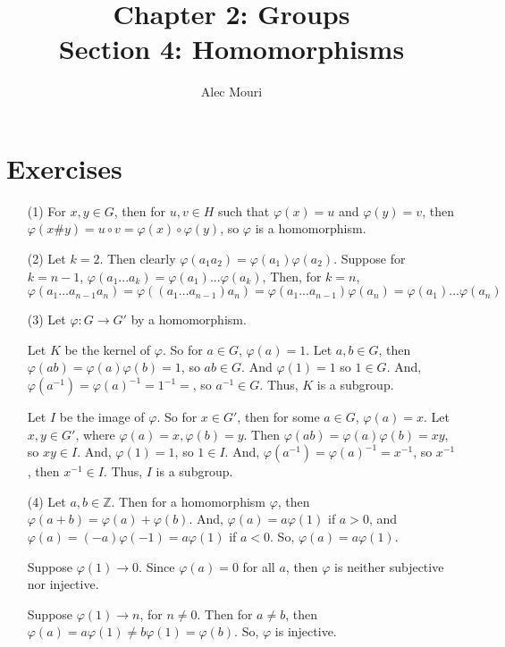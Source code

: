 \documentclass[12pt]{article}
\begin{document}
\title{Chapter 2: Groups \\ Section 4: Homomorphisms}
\author{Alec Mouri}

\maketitle
\section*{Exercises}
\begin{itemize}
\item[(1)]
For $x, y \in G$, then for $u, v \in H$ such that $\varphi(x) = u$ and $\varphi(y) = v$, then $\varphi(x \# y) = u \circ v = \varphi(x) \circ \varphi(y)$, so $\varphi$ is a homomorphism.
\item[(2)] Let $k = 2$. Then clearly $\varphi(a_1a_2) = \varphi(a_1)\varphi(a_2)$. Suppose for $k = n - 1$, $\varphi(a_1...a_k) = \varphi(a_1)...\varphi(a_k)$, Then, for $k = n$,
$$\varphi(a_1...a_{n-1}a_n) = \varphi((a_1...a_{n-1})a_n) = \varphi(a_1...a_{n-1})\varphi(a_n) = \varphi(a_1)...\varphi(a_n)$$
\item[(3)]
Let $\varphi: G \rightarrow G'$ by a homomorphism.

Let $K$ be the kernel of $\varphi$. So for $a \in G$, $\varphi(a) = 1$. Let $a, b \in G$, then $\varphi(ab) = \varphi(a)\varphi(b) = 1$, so $ab \in G$. And $\varphi(1) = 1$ so $1 \in G$. And, $\varphi(a^{-1}) = \varphi(a)^{-1} = 1^{-1} = $, so $a^{-1} \in G$. Thus, $K$ is a subgroup.

Let $I$ be the image of $\varphi$. So for $x \in G'$, then for some $a \in G$, $\varphi(a) = x$. Let $x, y \in G'$, where $\varphi(a) = x, \varphi(b) = y$. Then $\varphi(ab) = \varphi(a)\varphi(b) = xy$, so $xy \in I$. And, $\varphi(1) = 1$, so $1 \in I$. And, $\varphi(a^{-1}) = \varphi(a)^{-1} = x^{-1}$, so $x^{-1}$, then $x^{-1} \in I$. Thus, $I$ is a subgroup.
\item[(4)] Let $a, b \in \mathbb{Z}$. Then for a homomorphism $\varphi$, then $\varphi(a+b) = \varphi(a) + \varphi(b)$. And, $\varphi(a) = a\varphi(1)$ if $a >0$, and $\varphi(a) = (-a)\varphi(-1) = a\varphi(1)$ if $a < 0$. So, $\varphi(a) = a\varphi(1)$.

Suppose $\varphi(1) \rightarrow 0$. Since $\varphi(a) = 0$ for all $a$, then $\varphi$ is neither subjective nor injective.

Suppose $\varphi(1) \rightarrow n$, for $n \neq 0$. Then for $a \neq b$, then $\varphi(a) = a\varphi(1) \neq b\varphi(1) = \varphi(b)$. So, $\varphi$ is injective.


\end{itemize}
\end{document}
